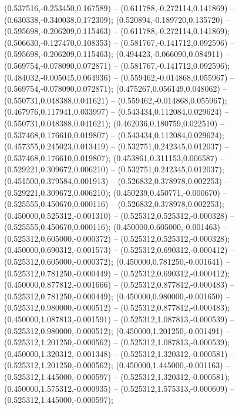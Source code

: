  (0.537516,-0.253450,0.167589) -- (0.611788,-0.272114,0.141869) -- (0.630338,-0.340038,0.172309);
 (0.520894,-0.189720,0.135720) -- (0.595698,-0.206209,0.115463) -- (0.611788,-0.272114,0.141869);
 (0.506630,-0.127470,0.108353) -- (0.581767,-0.141712,0.092596) -- (0.595698,-0.206209,0.115463);
 (0.494423,-0.066090,0.084911) -- (0.569754,-0.078090,0.072871) -- (0.581767,-0.141712,0.092596);
 (0.484032,-0.005045,0.064936) -- (0.559462,-0.014868,0.055967) -- (0.569754,-0.078090,0.072871);
 (0.475267,0.056149,0.048062) -- (0.550731,0.048388,0.041621) -- (0.559462,-0.014868,0.055967);
 (0.467976,0.117941,0.033997) -- (0.543434,0.112084,0.029624) -- (0.550731,0.048388,0.041621);
 (0.462036,0.180759,0.022510) -- (0.537468,0.176610,0.019807) -- (0.543434,0.112084,0.029624);
 (0.457355,0.245023,0.013419) -- (0.532751,0.242345,0.012037) -- (0.537468,0.176610,0.019807);
 (0.453861,0.311153,0.006587) -- (0.529221,0.309672,0.006210) -- (0.532751,0.242345,0.012037);
 (0.451500,0.379584,0.001913) -- (0.526832,0.378978,0.002253) -- (0.529221,0.309672,0.006210);
 (0.450239,0.450771,-0.000670) -- (0.525555,0.450670,0.000116) -- (0.526832,0.378978,0.002253);
 (0.450000,0.525312,-0.001310) -- (0.525312,0.525312,-0.000328) -- (0.525555,0.450670,0.000116);
 (0.450000,0.605000,-0.001463) -- (0.525312,0.605000,-0.000372) -- (0.525312,0.525312,-0.000328);
 (0.450000,0.690312,-0.001573) -- (0.525312,0.690312,-0.000412) -- (0.525312,0.605000,-0.000372);
 (0.450000,0.781250,-0.001641) -- (0.525312,0.781250,-0.000449) -- (0.525312,0.690312,-0.000412);
 (0.450000,0.877812,-0.001666) -- (0.525312,0.877812,-0.000483) -- (0.525312,0.781250,-0.000449);
 (0.450000,0.980000,-0.001650) -- (0.525312,0.980000,-0.000512) -- (0.525312,0.877812,-0.000483);
 (0.450000,1.087813,-0.001591) -- (0.525312,1.087813,-0.000539) -- (0.525312,0.980000,-0.000512);
 (0.450000,1.201250,-0.001491) -- (0.525312,1.201250,-0.000562) -- (0.525312,1.087813,-0.000539);
 (0.450000,1.320312,-0.001348) -- (0.525312,1.320312,-0.000581) -- (0.525312,1.201250,-0.000562);
 (0.450000,1.445000,-0.001163) -- (0.525312,1.445000,-0.000597) -- (0.525312,1.320312,-0.000581);
 (0.450000,1.575312,-0.000935) -- (0.525312,1.575313,-0.000609) -- (0.525312,1.445000,-0.000597);
